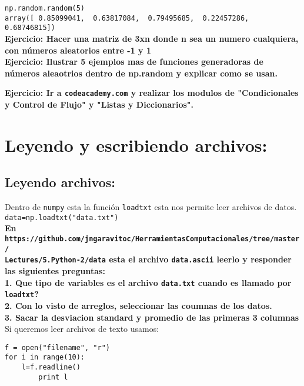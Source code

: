 \documentclass[12pt]{article}
\begin{document}
\verb+np.random.random(5)+ \\
\verb+array([ 0.85099041,  0.63817084,  0.79495685,  0.22457286,  0.68746815])+\\

{\bf Ejercicio: Hacer una matriz de 3xn donde n sea un numero cualquiera, con n\'umeros aleatorios entre 
-1 y 1}\\

{\bf Ejercicio: Ilustrar 5 ejemplos mas de funciones generadoras de n\'umeros aleaotrios dentro de np.random y explicar como se usan.}

{\bf Ejercicio: Ir a \verb+codeacademy.com+ y realizar los modulos de "Condicionales y Control de Flujo" y "Listas y Diccionarios".}

\section{Leyendo y escribiendo archivos:}

\subsection{Leyendo archivos:}

Dentro de \verb+numpy+ esta la funci\'on \verb+loadtxt+ esta nos permite leer archivos de datos. \\

\verb+data=np.loadtxt("data.txt")+\\

{\bf En \verb+https://github.com/jngaravitoc/HerramientasComputacionales/tree/master/+ \\
 \verb+Lectures/5.Python-2/data+ esta el archivo \verb+data.ascii+ leerlo y responder las 
siguientes preguntas:\\}
{\bf 1. Que tipo de variables es el archivo \verb+data.txt+ cuando es llamado por \verb+loadtxt+?}\\
{\bf 2. Con lo visto de arreglos, seleccionar las coumnas de los datos.}\\
{\bf 3. Sacar la desviacion standard y promedio de las primeras 3 columnas }\\

Si queremos leer archivos de texto usamos:\\

\begin{verbatim}
f = open("filename", "r")
for i in range(10):
	l=f.readline()
        print l
\end{verbatim}
\end{document}
